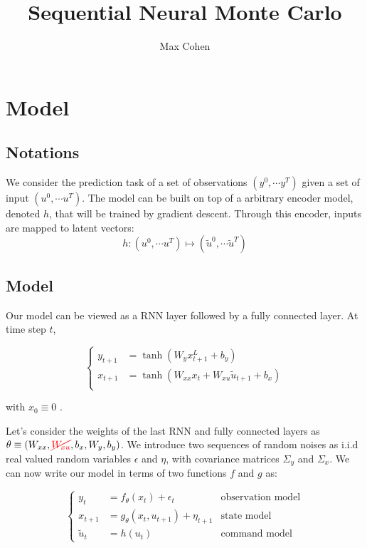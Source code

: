 \documentclass[10pt,a4paper]{report}
\begin{document}
\title{Sequential Neural Monte Carlo}
\author{Max Cohen}

\tableofcontents

\chapter{Model}
\section{Notations}
We consider the prediction task of a set of observations $(y^0, \cdots y^T)$ given a set of input $(u^0, \cdots u^T)$.
The model can be built on top of a arbitrary encoder model, denoted $h$, that will be trained by gradient descent.
Through this encoder, inputs are mapped to latent vectors:
$$
        h: (u^0, \cdots u^T) \mapsto (\tilde u^0, \cdots \tilde u^T)
$$

\section{Model}
Our model can be viewed as a RNN layer followed by a fully connected layer. At time step $t$,

\begin{equation*}
        \left\{
        \begin{aligned}
                y_{t+1} & = \tanh(W_y x_{t+1}^L + b_y)                        \\
                x_{t+1} & = \tanh(W_{xx} x_{t} + W_{xu} \tilde u_{t+1} + b_x) \\
        \end{aligned}
        \right.
\end{equation*}

with $x_{0} \equiv 0$ .

Let's consider the weights of the last RNN and fully connected layers as $\theta \equiv (W_{xx}, \textcolor{red}{\cancel{W_{xu}}}, b_x, W_y, b_y)$.
We introduce two sequences of random noises as i.i.d real valued random variables $\epsilon$ and $\eta$, with covariance matrices $\Sigma_y$ and $\Sigma_x$.
We can now write our model in terms of two functions $f$ and $g$ as:

\begin{equation}
        \left\{
        \begin{aligned}
                y_t        & = f_\theta(x_t) + \epsilon_t            & \text{observation model} \\
                x_{t+1}    & = g_\theta(x_{t}, u_{t+1}) + \eta_{t+1} & \text{state model}       \\
                \tilde u_t & = h(u_t)                                & \text{command model}
        \end{aligned}
        \right.
        \label{model_definition}
\end{equation}
\end{document}
